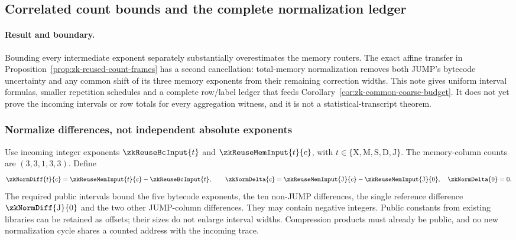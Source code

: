 \subsection{Correlated count bounds and the complete normalization ledger}\label{note:zk-count-budget}

\paragraph{Result and boundary.} Bounding every intermediate exponent separately substantially overestimates the memory routers. The exact affine transfer in Proposition~\ref{prop:zk-reused-count-frames} has a second cancellation: total-memory normalization removes both JUMP's bytecode uncertainty and any common shift of its three memory exponents from their remaining correction widths. This note gives uniform interval formulas, smaller repetition schedules and a complete row/label ledger that feeds Corollary~\ref{cor:zk-common-coarse-budget}. It does not yet prove the incoming intervals or row totals for every aggregation witness, and it is not a statistical-transcript theorem.

\subsubsection{Normalize differences, not independent absolute exponents}

Use incoming integer exponents $\zkReuseBcInput{t}$ and $\zkReuseMemInput{t}{c}$, with $t\in\{\mathrm X,\mathrm M,\mathrm S,\mathrm D,\mathrm J\}$. The memory-column counts are $(3,3,1,3,3)$. Define
\[
 \zkNormDiff{t}{c}=\zkReuseMemInput{t}{c}-\zkReuseBcInput{t},
 \qquad
 \zkNormDelta{c}=\zkReuseMemInput{\mathrm J}{c}-\zkReuseMemInput{\mathrm J}{0},
 \quad \zkNormDelta{0}=0.
\]
The required public intervals bound the five bytecode exponents, the ten non-JUMP differences, the single reference difference $\zkNormDiff{\mathrm J}{0}$ and the two other JUMP-column differences. They may contain negative integers. Public constants from existing libraries can be retained as offsets; their sizes do not enlarge interval widths. Compression products must already be public, and no new normalization cycle shares a counted address with the incoming trace.

